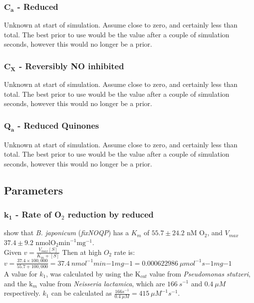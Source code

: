 \subsubsection*{$\mathbf{C_a}$ {\bf- Reduced \cbbthree{}}}
Unknown at start of simulation. Assume close to zero, and certainly less than total. The best prior to use would be the value after a couple of simulation seconds, however this would no longer be a prior.

\subsubsection*{$\mathbf{C_X}$ {\bf- Reversibly NO inhibited \cbbthree{}}}
Unknown at start of simulation. Assume close to zero, and certainly less than total. The best prior to use would be the value after a couple of simulation seconds, however this would no longer be a prior.

\subsubsection*{$\mathbf{Q_a}$ {\bf- Reduced Quinones}}
Unknown at start of simulation. Assume close to zero, and certainly less than total. The best prior to use would be the value after a couple of simulation seconds, however this would no longer be a prior.

\subsection*{Parameters}
\subsubsection*{$\mathbf{k_1}$ {\bf- Rate of O$_{\textrm{2}}$ reduction by reduced \cbbthree{}}}
\citet{Preisig1996} show that \textit{B. japonicum} \cbbthree{} (\textit{fixNOQP}) has a $K_m$ of $55.7 \pm 24.2$ nM $\mathrm{O}_2$, and $V_{max}$ $37.4 \pm 9.2$ $\mathrm{nmol O}_2 \mathrm{min}^{-1} \mathrm{mg}^{-1}$.\\
Given $v = \frac{V_{max}[S]}{K_m+[S]}$
Then at high $O_2$ rate is:
$v = \frac{37.4\times 100,000}{55.7+100,000} = 37.4~nmol^{-1}min{-1}mg{-1} = 0.000622986~\mu mol^{-1}s{-1}mg{-1}$\\

A value for $k_1$, was calculated by using the $\mathrm{K}_{cat}$ value from \textit{Pseudomonas stutzeri}\cite{Forte2001}, and the $\textrm{k}_m$ value from \textit{Neisseria lactamica}\cite{Hunter2007}, which are $166~s^{-1}$ and $0.4~\mu M$ respectively. $k_1$ can be calculated as $\frac{166s^{-1}}{0.4~\mu M} = 415~\mu M^{-1} s^{-1}$.

